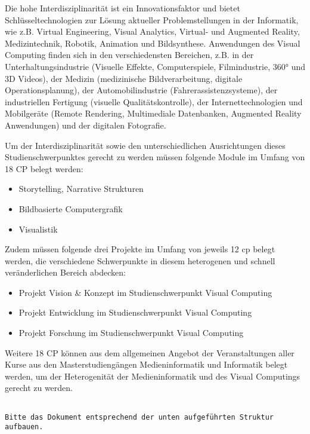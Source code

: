Die hohe Interdisziplinarität ist ein Innovationsfaktor und bietet
Schlüsseltechnologien zur Lösung aktueller Problemstellungen in der
Informatik, wie z.B. Virtual Engineering, Visual Analytics, Virtual- und
Augmented Reality, Medizintechnik, Robotik, Animation und Bildsynthese.
Anwendungen des Visual Computing finden sich in den verschiedensten
Bereichen, z.B. in der Unterhaltungsindustrie (Visuelle Effekte,
Computerspiele, Filmindustrie, 360° und 3D Videos), der Medizin
(medizinische Bildverarbeitung, digitale Operationsplanung), der
Automobilindustrie (Fahrerassistenzsysteme), der industriellen Fertigung
(visuelle Qualitätskontrolle), der Internettechnologien und Mobilgeräte
(Remote Rendering, Multimediale Datenbanken, Augmented Reality
Anwendungen) und der digitalen Fotografie.

Um der Interdisziplinarität sowie den unterschiedlichen Ausrichtungen
dieses Studienschwerpunktes gerecht zu werden müssen folgende Module im
Umfang von 18 CP belegt werden:

\begin{itemize}
\item
  Storytelling, Narrative Strukturen
\item
  Bildbasierte Computergrafik
\item
  Visualistik
\end{itemize}

Zudem müssen folgende drei Projekte im Umfang von jeweils 12 cp belegt
werden, die verschiedene Schwerpunkte in diesem heterogenen und schnell
veränderlichen Bereich abdecken:

\begin{itemize}
\item
  Projekt Vision \& Konzept im Studienschwerpunkt Visual Computing
\item
  Projekt Entwicklung im Studienschwerpunkt Visual Computing
\item
  Projekt Forschung im Studienschwerpunkt Visual Computing
\end{itemize}

Weitere 18 CP können aus dem allgemeinen Angebot der Veranstaltungen
aller Kurse aus den Masterstudiengängen Medieninformatik und Informatik
belegt werden, um der Heterogenität der Medieninformatik und des Visual
Computings gerecht zu werden.

\begin{verbatim}

Bitte das Dokument entsprechend der unten aufgeführten Struktur aufbauen.
\end{verbatim}

